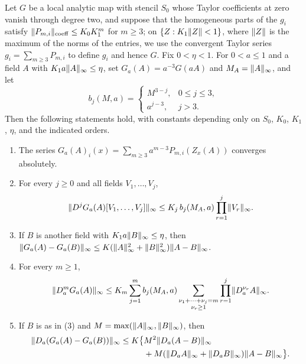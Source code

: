 \begin{lemma}\label{ch21:lem:stencil-analytic}
Let $G$ be a local analytic map with stencil $S_0$ whose Taylor coefficients at zero vanish through degree two, and suppose that the homogeneous parts of the $g_i$ satisfy $\lVert P_{m,i}\rVert_{\mathrm{coeff}}\le K_0K_1^m$ for $m\ge3$; on $\{Z:K_1\lVert Z\rVert<1\}$, where $\lVert Z\rVert$ is the maximum of the norms of the entries, we use the convergent Taylor series $g_i=\sum_{m\ge3}P_{m,i}$ to define $g_i$ and hence $G$. Fix $0<\eta<1$. For $0<a\le1$ and a field $A$ with $K_1a\lVert A\rVert_\infty\le\eta$, set $G_a(A)=a^{-3}G(aA)$ and $M_A=\lVert A\rVert_\infty$, and let
\[
 b_j(M,a)=\begin{cases}M^{3-j},&0\le j\le3,\\ a^{j-3},&j>3.\end{cases}
\]
Then the following statements hold, with constants depending only on $S_0$, $K_0$, $K_1$, $\eta$, and the indicated orders.
\begin{enumerate}
\item The series $G_a(A)_i(x)=\sum_{m\ge3}a^{m-3}P_{m,i}(Z_x(A))$ converges absolutely.
\item For every $j\ge0$ and all fields $V_1,\ldots,V_j$,
\[
 \lVert D^jG_a(A)[V_1,\ldots,V_j]\rVert_\infty\le K_j\,b_j(M_A,a)\prod_{r=1}^j\lVert V_r\rVert_\infty .
\]
\item If $B$ is another field with $K_1a\lVert B\rVert_\infty\le\eta$, then $\lVert G_a(A)-G_a(B)\rVert_\infty\le K(\lVert A\rVert_\infty^2+\lVert B\rVert_\infty^2)\lVert A-B\rVert_\infty$.
\item For every $m\ge1$,
\[
 \lVert D_a^mG_a(A)\rVert_\infty\le K_m\sum_{j=1}^mb_j(M_A,a)\sum_{\substack{\nu_1+\cdots+\nu_j=m\\ \nu_r\ge1}}\prod_{r=1}^j\lVert D_a^{\nu_r}A\rVert_\infty .
\]
\item If $B$ is as in (3) and $M=\max(\lVert A\rVert_\infty,\lVert B\rVert_\infty)$, then
\[
 \begin{split}
 \lVert D_a(G_a(A)-G_a(B))\rVert_\infty\le K\bigl\{&M^2\lVert D_a(A-B)\rVert_\infty\\
 &+M(\lVert D_aA\rVert_\infty+\lVert D_aB\rVert_\infty)\lVert A-B\rVert_\infty\bigr\}.
 \end{split}
\]
\end{enumerate}
\end{lemma}

